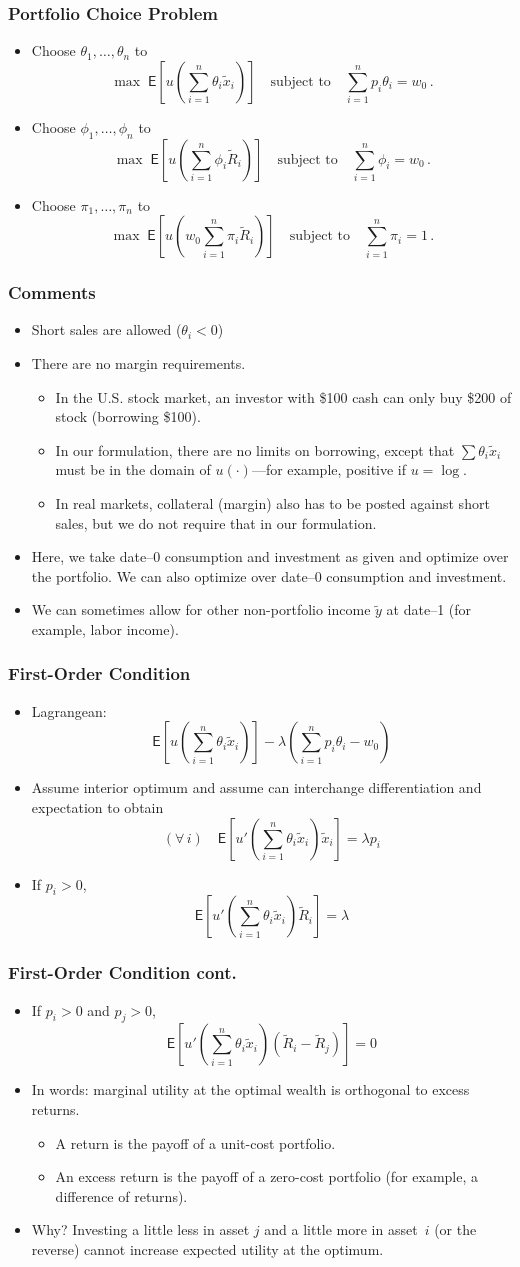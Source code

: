 \documentclass[10pt]{beamer}
\newcommand{\bi}{\begin{itemize}}
\newcommand{\ei}{\end{itemize}}
\newcommand{\im}{\item}
\newcommand{\mye}{\ensuremath{\mathsf{E}}}
\newcommand{\bfr}{\begin{frame}}
\newcommand{\tx}{\tilde{x}}
\newcommand{\ty}{\tilde{y}}
\newcommand{\tr}{\widetilde{R}}
\newcommand{\lb}{\left[}
\newcommand{\lp}{\left(}
\newcommand{\rb}{\right]}
\newcommand{\rp}{\right)}
\begin{document}
\bfr\frametitle{Portfolio Choice Problem}
\bi
\im Choose $\theta_1, \ldots, \theta_n$ to 
$$\max \; \mye\lb u\lp \sum_{i=1}^n \theta_i\tx_i \rp \rb \quad \text{subject to} \quad \sum_{i=1}^n p_i \theta_i = w_0\,.$$
\im Choose $\phi_1, \ldots, \phi_n$ to 
$$\max \;\mye\lb u\lp \sum_{i=1}^n \phi_i\tr_i \rp \rb \quad \text{subject to} \quad \sum_{i=1}^n \phi_i = w_0\,.$$
\im Choose $\pi_1, \ldots, \pi_n$ to 
$$\max \;\mye\lb u\lp w_0\sum_{i=1}^n \pi_i\tr_i \rp \rb \quad \text{subject to} \quad \sum_{i=1}^n \pi_i = 1\,.$$
\ei
\end{frame}

\bfr\frametitle{Comments}
\bi
\im Short sales are allowed ($\theta_i <0$)
\im There are no margin requirements.  
\bi
\im In the U.S. stock market, an investor with \$100 cash can only buy \$200 of stock (borrowing \$100).  
\im In our formulation, there are no limits on borrowing, except that $\sum \theta_i \tx_i$ must be in the domain of $u(\cdot)$---for example, positive if $u= \log$.
\im In real markets, collateral (margin) also has to be posted against short sales, but we do not require that in our formulation.
\ei
\im Here, we take date--0 consumption and investment as given and optimize over the portfolio.  We can also optimize over date--0 consumption and investment.
\im We can sometimes allow for other non-portfolio income $\ty$ at date--1 (for example, labor income).
\ei
\end{frame}

\bfr\frametitle{First-Order Condition}
\bi
\im Lagrangean:
$$\mye\lb u\lp \sum_{i=1}^n \theta_i\tx_i \rp \rb - \lambda \lp \sum_{i=1}^n p_i \theta_i - w_0 \rp$$
\im Assume interior optimum and assume can interchange differentiation and expectation to obtain
$$(\forall \, i) \quad \mye\lb u'\lp \sum_{i=1}^n \theta_i\tx_i \rp \tx_i \rb = \lambda p_i$$
\im If $p_i > 0$,
$$\mye\lb u'\lp \sum_{i=1}^n \theta_i\tx_i \rp \tr_i \rb = \lambda $$
\ei
\end{frame}

\bfr\frametitle{First-Order Condition cont.}
\bi
\im If $p_i>0$ and $p_j>0$,
$$\mye\lb u'\lp \sum_{i=1}^n \theta_i\tx_i \rp (\tr_i -\tr_j)\rb = 0 $$
\im In words: marginal utility at the optimal wealth is orthogonal to excess returns.
\bi
\im A return is the payoff of a unit-cost portfolio.  
\im An excess return is the payoff of a zero-cost portfolio (for example, a difference of returns).
\ei 
\im Why?  Investing a little less in asset $j$ and a little more in asset~$i$ (or the reverse) cannot increase expected utility at the optimum.
\ei
\end{frame}
\end{document}
